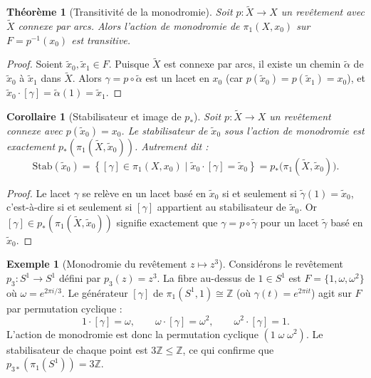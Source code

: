 \documentclass[12pt,a4paper,openany]{book}
\theoremstyle{definition}
\newtheorem{exemple}[definition]{Exemple}
\theoremstyle{plain}
\newtheorem{theoreme}[definition]{Théorème}
\newtheorem{corollaire}[definition]{Corollaire}
\theoremstyle{remark}
\newcommand{\Z}{\mathbb{Z}}
\newcommand{\set}[1]{\left\{#1\right\}}
\begin{document}
\begin{theoreme}[Transitivité de la monodromie]\label{thm:transitivite-monodromie}
Soit $p \colon \widetilde{X} \to X$ un revêtement avec $\widetilde{X}$ connexe par arcs.
Alors l'action de monodromie de $\pi_1(X, x_0)$ sur $F = p^{-1}(x_0)$ est \emph{transitive}.
\end{theoreme}

\begin{proof}
Soient $\tilde{x}_0, \tilde{x}_1 \in F$. Puisque $\widetilde{X}$ est connexe par arcs,
il existe un chemin $\tilde{\alpha}$ de $\tilde{x}_0$ à $\tilde{x}_1$ dans $\widetilde{X}$.
Alors $\gamma = p \circ \tilde{\alpha}$ est un lacet en $x_0$ (car $p(\tilde{x}_0) = p(\tilde{x}_1) = x_0$),
et $\tilde{x}_0 \cdot [\gamma] = \tilde{\alpha}(1) = \tilde{x}_1$.
\end{proof}

\begin{corollaire}[Stabilisateur et image de $p_*$]\label{cor:stabilisateur-image}
Soit $p \colon \widetilde{X} \to X$ un revêtement connexe avec $p(\tilde{x}_0) = x_0$.
Le stabilisateur de $\tilde{x}_0$ sous l'action de monodromie est exactement
$p_*(\pi_1(\widetilde{X}, \tilde{x}_0))$. Autrement dit :
\[
\mathrm{Stab}(\tilde{x}_0) = \set{[\gamma] \in \pi_1(X, x_0) \mid \tilde{x}_0 \cdot [\gamma] = \tilde{x}_0}
= p_*\!\big(\pi_1(\widetilde{X}, \tilde{x}_0)\big).
\]
\end{corollaire}

\begin{proof}
Le lacet $\gamma$ se relève en un lacet basé en $\tilde{x}_0$ si et seulement si
$\tilde{\gamma}(1) = \tilde{x}_0$, c'est-à-dire si et seulement si $[\gamma]$ appartient
au stabilisateur de $\tilde{x}_0$. Or $[\gamma] \in p_*(\pi_1(\widetilde{X}, \tilde{x}_0))$
signifie exactement que $\gamma = p \circ \tilde{\gamma}$ pour un lacet $\tilde{\gamma}$
basé en $\tilde{x}_0$.
\end{proof}

\begin{exemple}[Monodromie du revêtement $z \mapsto z^3$]\label{ex:monodromie-z3}
Considérons le revêtement $p_3 \colon S^1 \to S^1$ défini par $p_3(z) = z^3$. La fibre
au-dessus de $1 \in S^1$ est $F = \{1, \omega, \omega^2\}$ où $\omega = e^{2\pi i/3}$.
Le générateur $[\gamma]$ de $\pi_1(S^1, 1) \cong \Z$ (où $\gamma(t) = e^{2\pi it}$)
agit sur $F$ par permutation cyclique :
\[
1 \cdot [\gamma] = \omega, \qquad
\omega \cdot [\gamma] = \omega^2, \qquad
\omega^2 \cdot [\gamma] = 1.
\]
L'action de monodromie est donc la permutation cyclique $(1\;\omega\;\omega^2)$.
Le stabilisateur de chaque point est $3\Z \leq \Z$, ce qui confirme que
$p_{3*}(\pi_1(S^1)) = 3\Z$.
\end{exemple}
\end{document}

